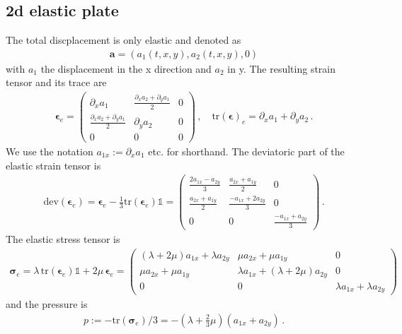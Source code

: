 \documentclass[11pt,a4paper]{article}
\newcommand{\p}{\partial}
\newcommand{\bb}[1]{\boldsymbol{#1}}
\newcommand{\dev}{\text{dev}}
\newcommand{\tr}{\text{tr}}
\begin{document}

\subsection{2d elastic plate}

The total discplacement is only elastic and denoted as
\begin{align*}
    \bb{a} = \left( a_1(t,x,y), a_2(t,x,y), 0\right)
\end{align*}
with $a_1$ the displacement in the x direction and $a_2$ in y. The resulting strain tensor and its trace are
\begin{align*}
    \bb{\epsilon}_e = 
    \begin{pmatrix}
        \p_x a_1 & \frac{\p_x a_2 + \p_y a_1}{2} & 0 \\
        \frac{\p_x a_2 + \p_y a_1}{2} & \p_y a_2 & 0 \\
        0 & 0 & 0 
    \end{pmatrix}
    \,, \quad
    \tr(\bb{\epsilon})_e = \p_x a_1 + \p_y a_2
    \,.
\end{align*}
We use the notation $a_{1x}:=\p_x a_1$ etc. for shorthand. The deviatoric part of the elastic strain tensor is
\begin{align*}
    \dev(\bb{\epsilon}_e) = \bb{\epsilon}_e - \frac{1}{3} \tr(\bb{\epsilon}_e) \mathbb{1}
    =
    \begin{pmatrix}
        \frac{2a_{1x}-a_{2y}}{3} & \frac{a_{2x} + a_{1y}}{2} & 0 \\
        \frac{a_{2x} + a_{1y}}{2} & \frac{-a_{1x}+2a_{2y}}{3} & 0 \\
        0 & 0 & \frac{-a_{1x}+a_{2y}}{3}
    \end{pmatrix}
    \,.
\end{align*}
The elastic stress tensor is
\begin{align*}
    \bb{\sigma}_e = 
    \lambda \, \tr(\bb{\epsilon}_e) \mathbb{1}+ 2 \mu \, \bb{\epsilon}_e
    =
    \begin{pmatrix}
        (\lambda + 2 \mu) a_{1x} + \lambda a_{2y} & \mu a_{2x} + \mu a_{1y} & 0 \\
        \mu a_{2x} + \mu a_{1y} & \lambda a_{1x} + (\lambda + 2 \mu) a_{2y} & 0 \\
        0 & 0 & \lambda a_{1x}+\lambda a_{2y}
    \end{pmatrix}
\end{align*}
and the pressure is
\begin{align*}
    p := - \tr(\bb{\sigma}_e)/3 =  -(\lambda + \frac{2}{3}\mu) (a_{1x} + a_{2y})
    \,.
\end{align*}
\end{document}
